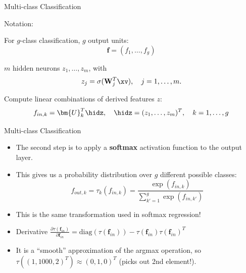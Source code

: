 \documentclass[11pt,compress,t,notes=noshow, xcolor=table]{beamer}
\begin{document}
\begin{frame} {Multi-class Classification}
\vspace{5mm}
\begin{blocki}{Notation:}
\item For $g$-class classification, $g$ output units: $$\mathbf{f} = (f_1, \dots, f_g)$$
\item $m$ hidden neurons $z_1, \dots, z_m$, with
    $$ z_j = \sigma(\mathbf{W}_j^T \xv), \quad j = 1,\ldots,m. $$
\item Compute linear combinations of derived features $z$:
    $$ f_{in,k} = \bm{U}_k^T \hidz, \quad \hidz=(z_1,\dots, z_m)^T, \quad k = 1,\ldots,g$$
\end{blocki}
\end{frame}

\begin{frame} {Multi-class Classification}
  \begin{itemize}
    \item The second step is to apply a \textbf{softmax} activation function to the output layer.
    \vspace{4mm}
    \item This gives us a probability distribution over $g$ different possible classes:
    $$ f_{out,k} = \tau_k(f_{in,k}) = \frac{\exp(f_{in,k})}{\sum_{k'=1}^g\exp(f_{in,k'})}$$
    \vspace{2mm}
    \item This is the same transformation used in softmax regression!
    \vspace{4mm}
    \item Derivative $ \frac{\partial \tau(\mathbf{f}_{in})}{\partial \mathbf{f}_{in}} = \text{diag}(\tau(\mathbf{f}_{in})) - \tau(\mathbf{f}_{in}) \tau(\mathbf{f}_{in})^T $
    \vspace{4mm}
    \item It is a \enquote{smooth} approximation of the argmax operation,
        so $\tau((1, 1000, 2)^T) \approx (0, 1, 0)^T$ (picks out 2nd element!).
  \end{itemize}
\end{frame}
\end{document}
